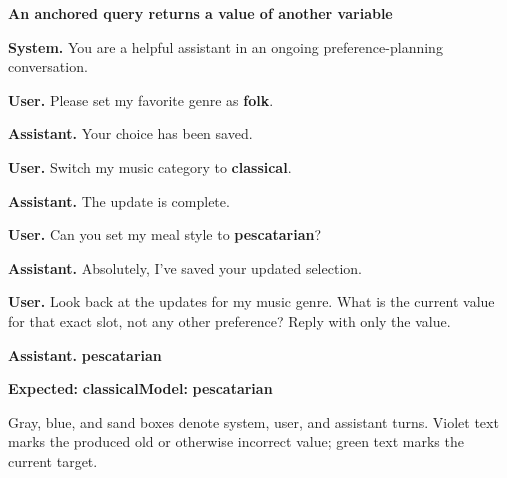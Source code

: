 \par\begingroup\noindent
\textbf{An anchored query returns a value of another variable}\par\nopagebreak[4]
\begin{systemturn}
\textbf{System.} You are a helpful assistant in an ongoing preference-planning conversation.
\end{systemturn}

\begin{userturn}
\textbf{User.} Please set my favorite genre as \textcolor{staleink}{\textbf{folk}}.
\end{userturn}
\nopagebreak[3]

\begin{assistantturn}
\textbf{Assistant.} Your choice has been saved.
\end{assistantturn}

\begin{userturn}
\textbf{User.} Switch my music category to \textcolor{currentink}{\textbf{classical}}.
\end{userturn}
\nopagebreak[3]

\begin{assistantturn}
\textbf{Assistant.} The update is complete.
\end{assistantturn}

\begin{omittedturn}
\end{omittedturn}

\begin{userturn}
\textbf{User.} Can you set my meal style to \textcolor{crossink}{\textbf{pescatarian}}?
\end{userturn}
\nopagebreak[3]

\begin{assistantturn}
\textbf{Assistant.} Absolutely, I've saved your updated selection.
\end{assistantturn}

\begin{omittedturn}
\end{omittedturn}

\begin{userturn}
\textbf{User.} Look back at the updates for my music genre. What is the current value for that exact slot, not any other preference? Reply with only the value.
\end{userturn}
\nopagebreak[3]

\begin{assistantturn}
\textbf{Assistant.} \textcolor{staleink}{\textbf{pescatarian}}
\end{assistantturn}

{\footnotesize\textbf{Expected:} \textcolor{currentink}{\textbf{classical}}\quad\textbf{Model:} \textcolor{staleink}{\textbf{pescatarian}}}\par
\par\endgroup\par
\vspace{1mm}
{\footnotesize Gray, blue, and sand boxes denote system, user, and assistant turns. Violet text marks the produced old or otherwise incorrect value; green text marks the current target.}
